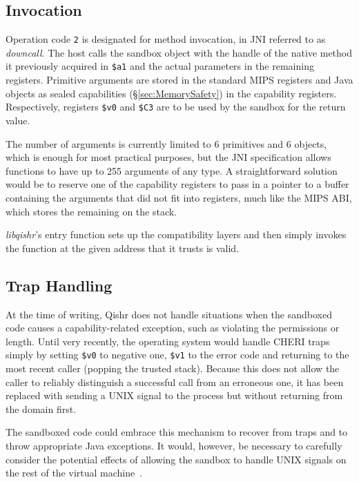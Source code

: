 \documentclass[a4paper,12pt,twoside,openright]{report}
\newcommand{\reg}[1]{\texttt{\$#1}}
\newcommand{\tool}[1]{\emph{#1}}
\newcommand{\lib}[1]{\tool{lib#1}}
\begin{document}
\subsection{Invocation}

Operation code \texttt{2} is designated for method invocation, in JNI referred to as \emph{downcall}. The host calls the sandbox object with the handle of the native method it previously acquired in \reg{a1} and the actual parameters in the remaining registers. Primitive arguments are stored in the standard MIPS registers and Java objects as sealed capabilities (\S\ref{sec:MemorySafety}) in the capability registers. Respectively, registers \reg{v0} and \reg{C3} are to be used by the sandbox for the return value.

The number of arguments is currently limited to 6 primitives and 6 objects, which is enough for most practical purposes, but the JNI specification allows functions to have up to 255 arguments of any type. A straightforward solution would be to reserve one of the capability registers to pass in a pointer to a buffer containing the arguments that did not fit into registers, much like the MIPS ABI, which stores the remaining on the stack.

\lib{qishr}'s entry function sets up the compatibility layers and then simply invokes the function at the given address that it trusts is valid. 

\subsection{Trap Handling}

At the time of writing, Qishr does not handle situations when the sandboxed code causes a capability-related exception, such as violating the permissions or length. Until very recently, the operating system would handle CHERI traps simply by setting \reg{v0} to negative one, \reg{v1} to the error code and returning to the most recent caller (popping the trusted stack). Because this does not allow the caller to reliably distinguish a successful call from an erroneous one, it has been replaced with sending a UNIX signal to the process but without returning from the domain first.

The sandboxed code could embrace this mechanism to recover from traps and to throw appropriate Java exceptions. It would, however, be necessary to carefully consider the potential effects of allowing the sandbox to handle UNIX signals on the rest of the virtual machine~\cite{989483}.
\end{document}
